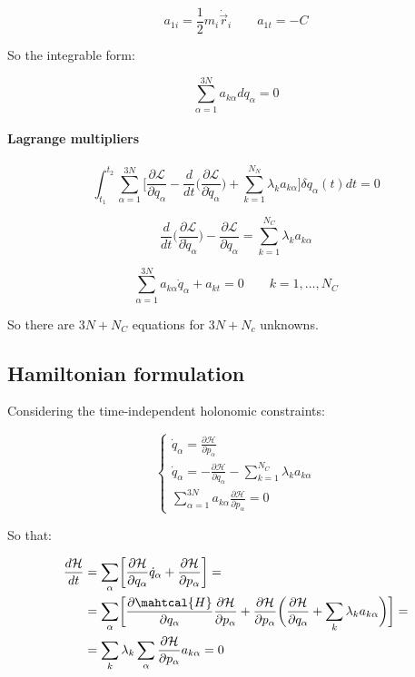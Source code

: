		$$a_{1i}=\frac{1}{2}m_i\dot{\vec{r}}_i\qquad a_{1t} = -C$$

		So the integrable form:

		$$\sum\limits_{\alpha=1}^{3N}a_{k\alpha}dq_\alpha=0$$

			\paragraph{Lagrange multipliers}

			$$\int_{t_1}^{t_2}\sum\limits_{\alpha=1}^{3N}\biggl[\frac{\partial\mathcal{L}}{\partial q_\alpha} - \frac{d}{dt}\biggl(\frac{\partial\mathcal{L}}{\partial\dot{q}_\alpha}\biggr) + \sum\limits_{k=1}^{N_N}\lambda_ka_{k\alpha}\biggr]\delta q_\alpha(t)dt = 0$$

			$$\frac{d}{dt}\biggl(\frac{\partial\mathcal{L}}{\partial\dot{q}_\alpha}\biggr) - \frac{\partial\mathcal{L}}{\partial q_\alpha} = \sum\limits_{k=1}^{N_C}\lambda_k a_{k\alpha}$$

			$$\sum\limits_{\alpha=1}^{3N}a_{k\alpha}\dot{q}_\alpha + a_{kt} = 0\qquad k = 1, \dots, N_C$$

			So there are $3N+N_C$ equations for $3N+N_c$ unknowns.

	\subsection{Hamiltonian formulation}
	Considering the time-independent holonomic constraints:

	$$\begin{cases}\dot{q}_\alpha = \frac{\partial\mathcal{H}}{\partial p_\alpha}\\\dot{q}_\alpha = -\frac{\partial\mathcal{H}}{\partial q_\alpha} - \sum\limits_{k=1}^{N_C}\lambda_ka_{k\alpha}\\\sum\limits_{\alpha=1}^{3N}a_{k\alpha}\frac{\partial\mathcal{H}}{\partial p_\alpha} = 0\end{cases}$$

	So that:

	\begin{align*}
		\frac{d\mathcal{H}}{dt} &= \sum\limits_\alpha\biggl[\frac{\partial\mathcal{H}}{\partial q_\alpha}\dot{q}_\alpha +\frac{\partial\mathcal{H}}{\partial p_\alpha}\biggr] = \\
														&=\sum\limits_\alpha\biggl[\frac{\partial\mahtcal{H}}{\partial q_\alpha}\frac{\partial\mathcal{H}}{\partial p_\alpha} + \frac{\partial\mathcal{H}}{\partial p_\alpha}\biggl(\frac{\partial\mathcal{H}}{\partial q_\alpha} + \sum\limits_k \lambda_ka_{k\alpha}\biggr)\biggr] = \\
														&=\sum\limits_k\lambda_k\sum\limits_\alpha\frac{\partial\mathcal{H}}{\partial p_\alpha}a_{k\alpha} = 0
	\end{align*}

